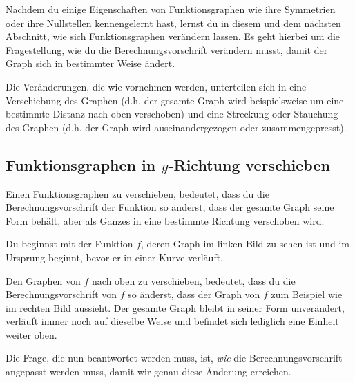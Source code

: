 \documentclass[../../main.tex]{subfiles}
\begin{document}
Nachdem du einige Eigenschaften von Funktionsgraphen wie ihre Symmetrien oder ihre Nullstellen kennengelernt hast, lernst du in diesem und dem nächsten Abschnitt, wie sich Funktionsgraphen verändern lassen. Es geht hierbei um die Fragestellung, wie du die Berechnungsvorschrift verändern musst, damit der Graph sich in bestimmter Weise ändert.

Die Veränderungen, die wie vornehmen werden, unterteilen sich in eine Verschiebung des Graphen (d.h. der gesamte Graph wird beispielsweise um eine bestimmte Distanz nach oben verschoben) und eine Streckung oder Stauchung des Graphen (d.h. der Graph wird auseinandergezogen oder zusammengepresst).

\subsection{Funktionsgraphen in $y$-Richtung verschieben}
\label{sec:abbildungen_verschieben_y}

Einen Funktionsgraphen zu verschieben, bedeutet, dass du die Berechnungsvorschrift der Funktion so änderst, dass der gesamte Graph seine Form behält, aber als Ganzes in eine bestimmte Richtung verschoben wird.

\begin{example}{}
    Du beginnst mit der Funktion $f$, deren Graph im linken Bild zu sehen ist und im Ursprung beginnt, bevor er in einer Kurve verläuft.
    
    Den Graphen von $f$ nach oben zu verschieben, bedeutet, dass du die Berechnungsvorschrift von $f$ so änderst, dass der Graph von $f$ zum Beispiel wie im rechten Bild aussieht. Der gesamte Graph bleibt in seiner Form unverändert, verläuft immer noch auf dieselbe Weise und befindet sich lediglich eine Einheit weiter oben.
    \begin{multicols}{2}\centering
        
    \end{multicols}
    
    Die Frage, die nun beantwortet werden muss, ist, \emph{wie} die Berechnungsvorschrift angepasst werden muss, damit wir genau diese Änderung erreichen.
\end{example}
\end{document}
